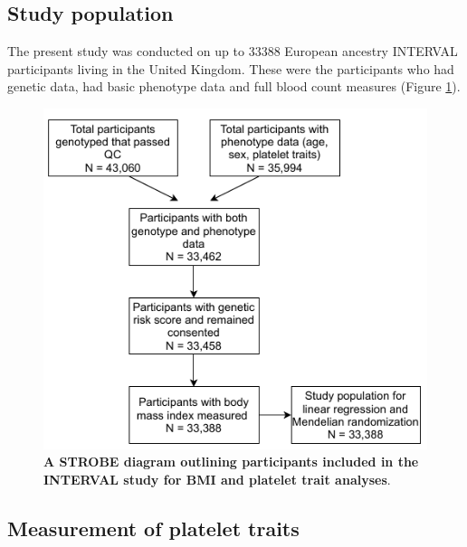 \documentclass[11pt,twoside]{bristolthesis}
\begin{document}
\par

\hypertarget{study-population}{%
\subsection{Study population}\label{study-population}}

The present study was conducted on up to 33388 European ancestry INTERVAL participants living in the United Kingdom. These were the participants who had genetic data, had basic phenotype data and full blood count measures (Figure \ref{fig:INTERVAL-STROBE}).



\begin{figure}
\includegraphics[width=0.6\linewidth]{figure/BMI_platelets/STROBE_diagram} \caption[A STROBE diagram outlining participants included in the INTERVAL study for BMI and platelet trait analyses.]{\textbf{A STROBE diagram outlining participants included in the INTERVAL study for BMI and platelet trait analyses}.}\label{fig:INTERVAL-STROBE}
\end{figure}
\hypertarget{measurement-of-platelet-traits}{%
\subsection{Measurement of platelet traits}\label{measurement-of-platelet-traits}}
\end{document}
